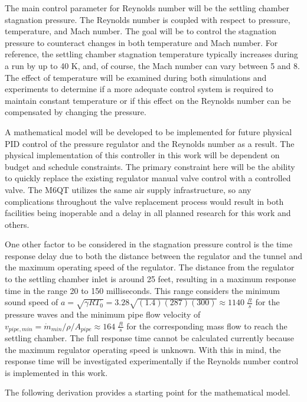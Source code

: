 The main control parameter for Reynolds number will be the settling chamber stagnation pressure. The Reynolds number is coupled with respect to pressure, temperature, and Mach number. The goal will be to control the stagnation pressure to counteract changes in both temperature and Mach number. For reference, the settling chamber stagnation temperature typically increases during a run by up to 40 K, and, of course, the Mach number can vary between 5 and 8. The effect of temperature will be examined during both simulations and experiments to determine if a more adequate control system is required to maintain constant temperature or if this effect on the Reynolds number can be compensated by changing the pressure.

A mathematical model will be developed to be implemented for future physical PID control of the pressure regulator and the Reynolds number as a result. The physical implementation of this controller in this work will be dependent on budget and schedule constraints. The primary constraint here will be the ability to quickly replace the existing regulator manual valve control with a controlled valve. The M6QT utilizes the same air supply infrastructure, so any complications throughout the valve replacement process would result in both facilities being inoperable and a delay in all planned research for this work and others.

One other factor to be considered in the stagnation pressure control is the time response delay due to both the distance between the regulator and the tunnel and the maximum operating speed of the regulator. The distance from the regulator to the settling chamber inlet is around 25 feet, resulting in a maximum response time in the range 20 to 150 milliseconds. This range  considers the minimum sound speed of $a = \sqrt{\gamma R T_0} = 3.28\sqrt{(1.4)(287)(300)} \approx 1140 \; \frac{ft}{s}$ for the pressure waves and the minimum pipe flow velocity of $v_{pipe,min} = \dot{m}_{min}/\rho/A_{pipe} \approx 164 \; \frac{ft}{s}$ for the corresponding mass flow to reach the settling chamber. The full response time cannot be calculated currently because the maximum regulator operating speed is unknown. With this in mind, the response time will be investigated experimentally if the Reynolds number control is implemented in this work.

The following derivation provides a starting point for the mathematical model. 

